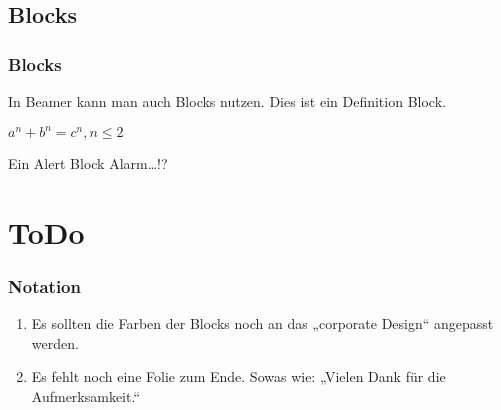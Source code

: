 \documentclass{beamer}
\begin{document}
\subsection{Blocks}
\subsectionframe
\begin{frame}
\frametitle{Blocks}
\begin{definition}[Block]
In Beamer kann man auch Blocks nutzen. Dies ist ein Definition Block.
\end{definition}

\begin{theorem}
$a^n + b^n = c^n, n \leq 2$ 
\end{theorem}

\begin{alertblock}{Ein Alert Block}
Alarm…!?
\end{alertblock}
\end{frame}


\section{ToDo} %
\label{sec:Was moch zu tun ist}
\sectionframe

\begin{frame}

\frametitle{Notation}
\begin{definition}[ToDo]
\begin{enumerate}[<+->]
\item Es sollten die Farben der Blocks noch an das „corporate Design“ angepasst werden.
\item Es fehlt noch eine Folie zum Ende. Sowas wie: „Vielen Dank für die Aufmerksamkeit.“
\end{enumerate}


\end{definition}
\end{frame}
\end{document}

